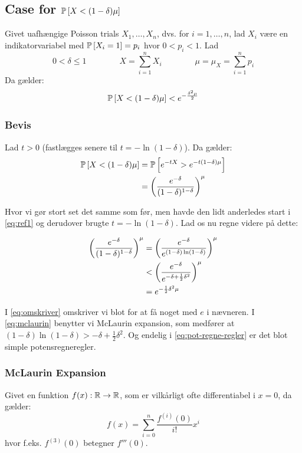 \subsection{Case for $\P{X < (1 - \delta) \mu}$}
Givet uafhængige Poisson trials $X_1, \dots, X_n$, dvs. for $i = 1, \dots, n$, lad $X_i$ være en indikatorvariabel med $\P{X_i = 1} = p_i$ hvor $0 < p_i < 1$. Lad
$$
0 < \delta \leq 1
\quad\quad\quad\quad
X = \sum_{i=1}^n X_i
\quad\quad\quad\quad
\mu = \mu_X = \sum_{i=1}^n p_i
$$
Da gælder:
\begin{align}
  \P{X < (1 - \delta) \mu} < e^{- \frac{\delta^2 \mu}{2}} \label{eq:chernoff-2}
\end{align}


\subsubsection{Bevis}
Lad $t > 0$ (fastlægges senere til $t = - \ln(1 - \delta)$). Da gælder:
\begin{align}
  \P{X < (1 - \delta) \mu}
  &= \P{e^{- t X} > e^{-t (1 - \delta) \mu} } \label{eq:ref1} \\
  &= \pfrac{e^{-\delta}}{(1 - \delta)^{1 - \delta}}^\mu \nonumber
\end{align}

Hvor vi gør stort set det samme som før, men havde den lidt anderledes start i \cref{eq:ref1} og derudover brugte $t = -\ln(1 - \delta)$. Lad os nu regne videre på dette:


\begin{align}
  \pfrac{e^{-\delta}}{(1 - \delta)^{1 - \delta}}^\mu
  &= \pfrac{e^{-\delta}}{e^{(1 - \delta) \ln (1 - \delta)}}^\mu \label{eq:omskriver} \\
  &< \pfrac{e^{- \delta}}{e^{- \delta + \frac{1}{2} \delta^2}}^\mu \label{eq:mclaurin} \\
  &= e^{- \frac{1}{2} \delta^2 \mu} \label{eq:pot-regne-regler}
\end{align}

I \cref{eq:omskriver} omskriver vi blot for at få noget med $e$ i nævneren. I \cref{eq:mclaurin} benytter vi McLaurin expansion, som medfører at $(1 - \delta) \ln(1 - \delta) > - \delta + \frac{1}{2} \delta^2$. Og endelig i \cref{eq:pot-regne-regler} er det blot simple potensregneregler.

\subsubsection{McLaurin Expansion}
Givet en funktion $f(x) : \R \to \R$, som er vilkårligt ofte differentiabel i $x = 0$, da gælder:
$$
f(x) = \sum_{i=0}^n \frac{f^{(i)} (0)}{i!} x^i
$$
hvor f.eks. $f^{(3)} (0)$ betegner $f'''(0)$.\\

